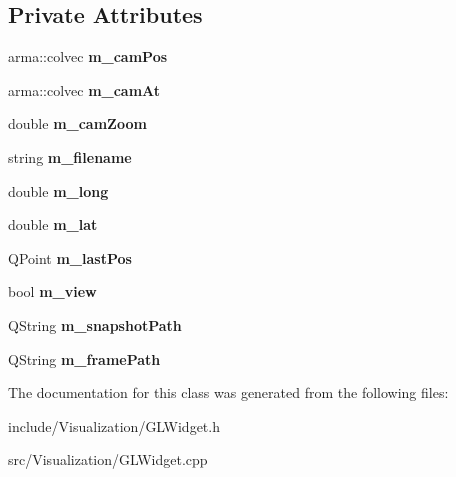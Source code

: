 \subsection*{Private Attributes}
\begin{DoxyCompactItemize}
\item 
\hypertarget{class_g_l_widget_aa66efb8d767894fcb141913ba9dbae11}{arma\-::colvec {\bfseries m\-\_\-cam\-Pos}}\label{class_g_l_widget_aa66efb8d767894fcb141913ba9dbae11}

\item 
\hypertarget{class_g_l_widget_a3050be303596d9558380eb45188a6a33}{arma\-::colvec {\bfseries m\-\_\-cam\-At}}\label{class_g_l_widget_a3050be303596d9558380eb45188a6a33}

\item 
\hypertarget{class_g_l_widget_ab58c3a83eaad7958ef32a0e38312dfa0}{double {\bfseries m\-\_\-cam\-Zoom}}\label{class_g_l_widget_ab58c3a83eaad7958ef32a0e38312dfa0}

\item 
\hypertarget{class_g_l_widget_a4911eae2c543a1dbd35a2f21d4da1dd5}{string {\bfseries m\-\_\-filename}}\label{class_g_l_widget_a4911eae2c543a1dbd35a2f21d4da1dd5}

\item 
\hypertarget{class_g_l_widget_ae2e31a41f9a824cab2ebb039efdf8e6f}{double {\bfseries m\-\_\-long}}\label{class_g_l_widget_ae2e31a41f9a824cab2ebb039efdf8e6f}

\item 
\hypertarget{class_g_l_widget_a8246562eab0ffa67f6f3aaae4208b7f6}{double {\bfseries m\-\_\-lat}}\label{class_g_l_widget_a8246562eab0ffa67f6f3aaae4208b7f6}

\item 
\hypertarget{class_g_l_widget_aac1f587db6a0e2112fe4c21fc449f470}{Q\-Point {\bfseries m\-\_\-last\-Pos}}\label{class_g_l_widget_aac1f587db6a0e2112fe4c21fc449f470}

\item 
\hypertarget{class_g_l_widget_a89b241a362a60322f411bd0fbdccfb60}{bool {\bfseries m\-\_\-view}}\label{class_g_l_widget_a89b241a362a60322f411bd0fbdccfb60}

\item 
\hypertarget{class_g_l_widget_a4d466e74fd00b09d4474e8c6163b7094}{Q\-String {\bfseries m\-\_\-snapshot\-Path}}\label{class_g_l_widget_a4d466e74fd00b09d4474e8c6163b7094}

\item 
\hypertarget{class_g_l_widget_a593d0bcfcb11c4c0c43f75bc35f4e4b1}{Q\-String {\bfseries m\-\_\-frame\-Path}}\label{class_g_l_widget_a593d0bcfcb11c4c0c43f75bc35f4e4b1}

\end{DoxyCompactItemize}


The documentation for this class was generated from the following files\-:\begin{DoxyCompactItemize}
\item 
include/\-Visualization/G\-L\-Widget.\-h\item 
src/\-Visualization/G\-L\-Widget.\-cpp\end{DoxyCompactItemize}
